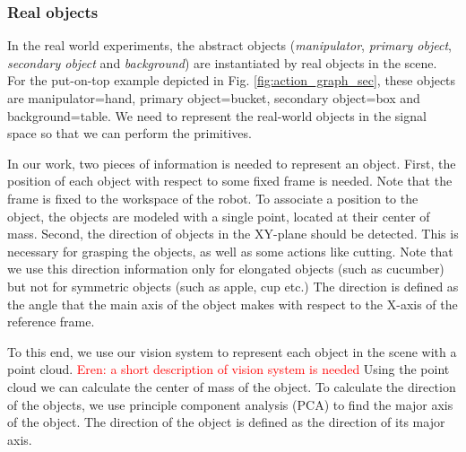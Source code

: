 \subsubsection{Real objects}
In the real world experiments, the abstract objects (\textit{manipulator}, \textit{primary object}, \textit{secondary object} and \textit{background})
are instantiated by real objects in the scene.
For the put-on-top example depicted in Fig. \ref{fig:action_graph_sec},
these objects are manipulator=hand, primary object=bucket, secondary object=box and background=table.
We need to represent the real-world objects in the signal space so that we can perform the primitives.

In our work, two pieces of information is needed to represent an object.
First, the position of each object with respect to some fixed frame is needed.
Note that the frame is fixed to the workspace of the robot.
To associate a position to the object, the objects are modeled with a single point, located at their center of mass.
Second, the direction of objects in the XY-plane should be detected.
This is necessary for grasping the objects, as well as some actions like cutting.
Note that we use this direction information only for elongated objects (such as cucumber) but not for symmetric objects (such as apple, cup etc.)
The direction is defined as the angle that the main axis of the object makes with respect to the X-axis of the reference frame.

To this end, we use our vision system to represent each object in the scene with a point cloud.
\textcolor{red}{Eren: a short description of vision system is needed}
Using the point cloud we can calculate the center of mass of the object.
To calculate the direction of the objects, we use principle component analysis (PCA) to find the major axis of the object.
The direction of the object is defined as the direction of its major axis.

